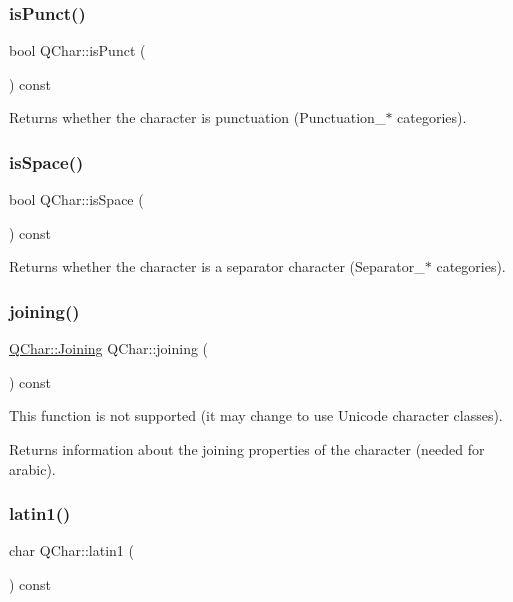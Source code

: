 \subsubsection{\texorpdfstring{isPunct()}{isPunct()}}
{\footnotesize\ttfamily bool Q\+Char\+::is\+Punct (\begin{DoxyParamCaption}{ }\end{DoxyParamCaption}) const}

Returns whether the character is punctuation (Punctuation\+\_\+$\ast$ categories). \mbox{\label{class_q_char_a67814eae107b451db9def198ae57aa8a}} 
\subsubsection{\texorpdfstring{isSpace()}{isSpace()}}
{\footnotesize\ttfamily bool Q\+Char\+::is\+Space (\begin{DoxyParamCaption}{ }\end{DoxyParamCaption}) const}

Returns whether the character is a separator character (Separator\+\_\+$\ast$ categories). \mbox{\label{class_q_char_ad009b86964d2cced7c75235f3292b03f}} 
\subsubsection{\texorpdfstring{joining()}{joining()}}
{\footnotesize\ttfamily \mbox{\hyperlink{class_q_char_a086edd55a90ad2cf910ca3ab5fbe7bde}{Q\+Char\+::\+Joining}} Q\+Char\+::joining (\begin{DoxyParamCaption}{ }\end{DoxyParamCaption}) const}

This function is not supported (it may change to use Unicode character classes).

Returns information about the joining properties of the character (needed for arabic). \mbox{\label{class_q_char_a1f86dd8a75eb74565a46caf76a41df8f}} 
\subsubsection{\texorpdfstring{latin1()}{latin1()}}
{\footnotesize\ttfamily char Q\+Char\+::latin1 (\begin{DoxyParamCaption}{ }\end{DoxyParamCaption}) const\hspace{0.3cm}{\ttfamily [inline]}}

